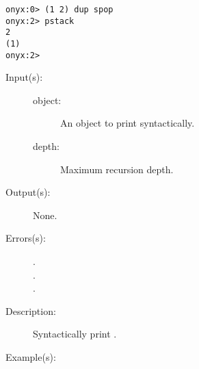\begin{description}
\begin{description}
\begin{verbatim}
onyx:0> (1 2) dup spop
onyx:2> pstack
2
(1)
onyx:2>
		\end{verbatim}
	\end{description}
\label{systemdict:sprint}
\item[{\onyxop{object depth}{sprint}{--}}: ]
	\begin{description}\item[]
	\item[Input(s): ]
		\begin{description}\item[]
		\item[object: ]
			An object to print syntactically.
		\item[depth: ]
			Maximum recursion depth.
		\end{description}
	\item[Output(s): ] None.
	\item[Errors(s): ]
		\begin{description}\item[]
		\item[.]
		\item[.]
		\item[.]
		\end{description}
	\item[Description: ]
		Syntactically print .
	\item[Example(s): ]\begin{verbatim}


\end{verbatim}
\end{description}
\end{description}

